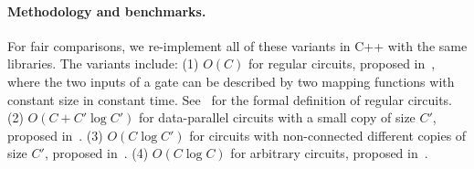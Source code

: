 \paragraph{Methodology and benchmarks.} For fair comparisons, we re-implement all of these variants in C++ with the same libraries. The variants include: (1) $O(C)$ for regular circuits, proposed in~\cite{JT_Thesis}, where the two inputs of a gate can be described by two mapping functions with constant size in constant time. See~\cite{JT_Thesis} for the formal definition of regular circuits. (2) $O(C+C'\log C')$ for data-parallel circuits with a small copy of size $C'$, proposed in~\cite{wahby2017full}. (3) $O(C\log C')$ for circuits with non-connected different copies of size $C'$, proposed in~\cite{vram}. (4) $O(C\log C)$ for arbitrary circuits, proposed in~\cite{CMT}.

